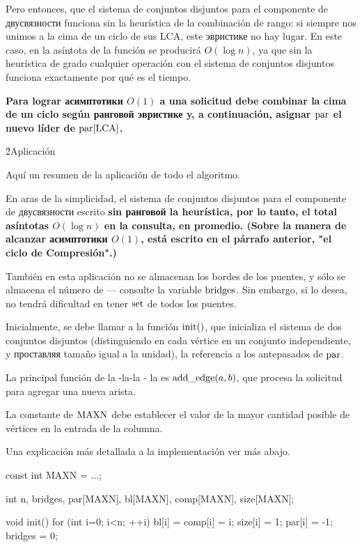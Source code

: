{Pero entonces, que el sistema de conjuntos disjuntos para el componente de двусвязности funciona sin la heurística de la combinación de rango: si siempre nos unimos a la cima de un ciclo de sus LCA, este эвристике no hay lugar. En este caso, en la asíntota de la función se producirá $O(\log n)$, ya que sin la heurística de grado cualquier operación con el sistema de conjuntos disjuntos funciona exactamente por qué es el tiempo.

\bf{Para lograr асимптотики $O(1)$} a una solicitud debe combinar la cima de un ciclo según ранговой эвристике y, a continuación, asignar ${\rm par}$ el nuevo líder de ${\rm par}[{\rm LCA}]$.

}



\h2{Aplicación}

Aquí un resumen de la aplicación de todo el algoritmo.

En aras de la simplicidad, el sistema de conjuntos disjuntos para el componente de двусвязности escrito \bf{sin ранговой la heurística}, por lo tanto, el total asíntotas $O(\log n)$ en la consulta, en promedio. (Sobre la manera de alcanzar асимптотики $O(1)$, está escrito en el párrafo anterior, "el ciclo de Compresión".)

También en esta aplicación no se almacenan los bordes de los puentes, y sólo se almacena el número de --- consulte la variable $\rm bridges$. Sin embargo, si lo desea, no tendrá dificultad en tener ${\rm set}$ de todos los puentes.

Inicialmente, se debe llamar a la función ${\rm init}()$, que inicializa el sistema de dos conjuntos disjuntos (distinguiendo en cada vértice en un conjunto independiente, y проставляя tamaño igual a la unidad), la referencia a los antepasados de ${\rm par}$.

La principal función de la -la-la - la es ${\rm add\_edge}(a,b)$, que procesa la solicitud para agregar una nueva arista.

La constante de $\rm MAXN$ debe establecer el valor de la mayor cantidad posible de vértices en la entrada de la columna.

Una explicación más detallada a la implementación ver más abajo.


\code
const int MAXN = ...;

int n, bridges, par[MAXN], bl[MAXN], comp[MAXN], size[MAXN];


void init() {
for (int i=0; i<n; ++i) {
bl[i] = comp[i] = i;
size[i] = 1;
par[i] = -1;
}
bridges = 0;
}


